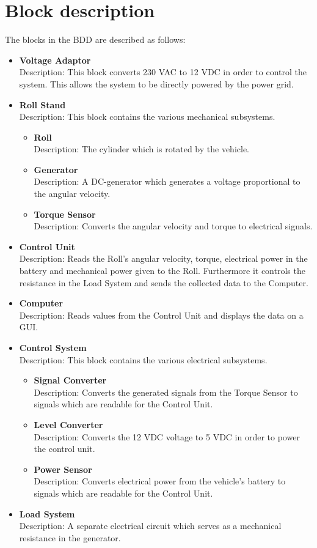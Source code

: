\section{Block description}
The blocks in the BDD are described as follows:

\begin{itemize}
	\item \textbf{Voltage Adaptor}\\
	Description: This block converts 230 VAC to 12 VDC in order to control the system. This allows the system to be directly powered by the power grid.
	\item \textbf{Roll Stand}\\
	Description: This block contains the various mechanical subsystems.
	\begin{itemize}
		\item \textbf{Roll}\\
		Description: The cylinder which is rotated by the vehicle.
		\item \textbf{Generator}\\
		Description: A DC-generator which generates a voltage proportional to the angular velocity.
		\item \textbf{Torque Sensor}\\
		Description: Converts the angular velocity and torque to electrical signals.
	\end{itemize}
	\item \textbf{Control Unit}\\
	Description: Reads the Roll's angular velocity, torque, electrical power in the battery and mechanical power given to the Roll. Furthermore it controls the resistance in the Load System and sends the collected data to the Computer.
	\item \textbf{Computer}\\
	Description: Reads values from the Control Unit and displays the data on a GUI.
	\item \textbf{Control System}\\
	Description: This block contains the various electrical subsystems.
	\begin{itemize}
		\item \textbf{Signal Converter}\\
		Description: Converts the generated signals from the Torque Sensor to signals which are readable for the Control Unit.
		\item \textbf{Level Converter}\\
		Description: Converts the 12 VDC voltage to 5 VDC in order to power the control unit.
		\item \textbf{Power Sensor}\\
		Description: Converts electrical power from the vehicle's battery to signals which are readable for the Control Unit.
	\end{itemize}
	\item \textbf{Load System}\\
	Description: A separate electrical circuit which serves as a mechanical resistance in the generator.
\end{itemize}